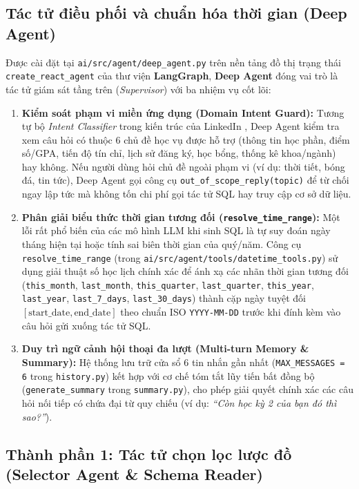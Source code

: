 \documentclass[12pt,a4paper]{report}
\begin{document}
\subsection{Tác tử điều phối và chuẩn hóa thời gian (Deep Agent)}

Được cài đặt tại \texttt{ai/src/agent/deep\_agent.py} trên nền tảng đồ thị trạng thái \texttt{create\_react\_agent} của thư viện \textbf{LangGraph}, \textbf{Deep Agent} đóng vai trò là tác tử giám sát tầng trên (\textit{Supervisor}) với ba nhiệm vụ cốt lõi:
\begin{enumerate}
    \item \textbf{Kiểm soát phạm vi miền ứng dụng (Domain Intent Guard):} Tương tự bộ \textit{Intent Classifier} trong kiến trúc của LinkedIn \cite{chen2025enterprise}, Deep Agent kiểm tra xem câu hỏi có thuộc 6 chủ đề học vụ được hỗ trợ (thông tin học phần, điểm số/GPA, tiến độ tín chỉ, lịch sử đăng ký, học bổng, thống kê khoa/ngành) hay không. Nếu người dùng hỏi chủ đề ngoài phạm vi (ví dụ: thời tiết, bóng đá, tin tức), Deep Agent gọi công cụ \texttt{out\_of\_scope\_reply(topic)} để từ chối ngay lập tức mà không tốn chi phí gọi tác tử SQL hay truy cập cơ sở dữ liệu.
    \item \textbf{Phân giải biểu thức thời gian tương đối (\texttt{resolve\_time\_range}):} Một lỗi rất phổ biến của các mô hình LLM khi sinh SQL là tự suy đoán ngày tháng hiện tại hoặc tính sai biên thời gian của quý/năm. Công cụ \texttt{resolve\_time\_range} (trong \texttt{ai/src/agent/tools/datetime\_tools.py}) sử dụng giải thuật số học lịch chính xác để ánh xạ các nhãn thời gian tương đối (\texttt{this\_month}, \texttt{last\_month}, \texttt{this\_quarter}, \texttt{last\_quarter}, \texttt{this\_year}, \texttt{last\_year}, \texttt{last\_7\_days}, \texttt{last\_30\_days}) thành cặp ngày tuyệt đối $[\text{start\_date}, \text{end\_date}]$ theo chuẩn ISO \texttt{YYYY-MM-DD} trước khi đính kèm vào câu hỏi gửi xuống tác tử SQL.
    \item \textbf{Duy trì ngữ cảnh hội thoại đa lượt (Multi-turn Memory \& Summary):} Hệ thống lưu trữ cửa sổ 6 tin nhắn gần nhất (\texttt{MAX\_MESSAGES = 6} trong \texttt{history.py}) kết hợp với cơ chế tóm tắt lũy tiến bất đồng bộ (\texttt{generate\_summary} trong \texttt{summary.py}), cho phép giải quyết chính xác các câu hỏi nối tiếp có chứa đại từ quy chiếu (ví dụ: \textit{``Còn học kỳ 2 của bạn đó thì sao?''}).
\end{enumerate}

\subsection{Thành phần 1: Tác tử chọn lọc lược đồ (Selector Agent \& Schema Reader)}
\end{document}
